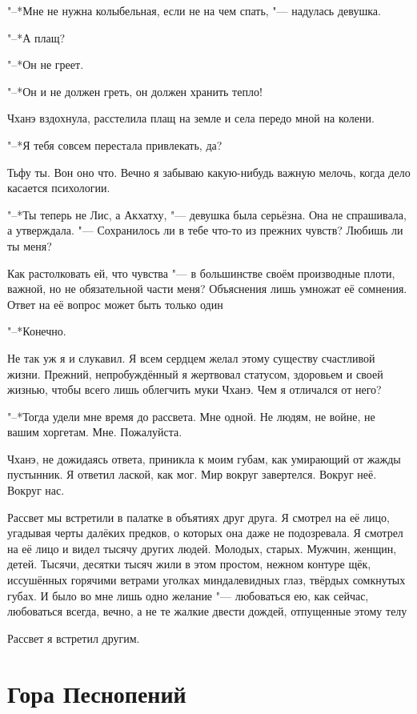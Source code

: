 "--*Мне не нужна колыбельная, если не на чем спать, "--- надулась девушка.

"--*А плащ?

"--*Он не греет.

"--*Он и не должен греть, он должен хранить тепло!

Чханэ вздохнула, расстелила плащ на земле и села передо мной на колени.

"--*Я тебя совсем перестала привлекать, да?

Тьфу ты.
Вон оно что.
Вечно я забываю какую-нибудь важную мелочь, когда дело касается психологии.

"--*Ты теперь не Лис, а Акхатху, "--- девушка была серьёзна.
Она не спрашивала, а утверждала.
"--- Сохранилось ли в тебе что-то из прежних чувств?
Любишь ли ты меня?

Как растолковать ей, что чувства "--- в большинстве своём производные плоти, важной, но не обязательной части меня?
Объяснения лишь умножат её сомнения.
Ответ на её вопрос может быть только один\ldotst

"--*Конечно.

Не так уж я и слукавил.
Я всем сердцем желал этому существу счастливой жизни.
Прежний, непробуждённый я жертвовал статусом, здоровьем и своей жизнью, чтобы всего лишь облегчить муки Чханэ.
Чем я отличался от него?

"--*Тогда удели мне время до рассвета.
Мне одной.
Не людям, не войне, не вашим хоргетам.
Мне.
Пожалуйста.

Чханэ, не дожидаясь ответа, приникла к моим губам, как умирающий от жажды пустынник.
Я ответил лаской, как мог.
Мир вокруг завертелся.
Вокруг неё.
Вокруг нас.

Рассвет мы встретили в палатке в объятиях друг друга.
Я смотрел на её лицо, угадывая черты далёких предков, о которых она даже не подозревала.
Я смотрел на её лицо и видел тысячу других людей.
Молодых, старых.
Мужчин, женщин, детей.
Тысячи, десятки тысяч жили в этом простом, нежном контуре щёк, иссушённых горячими ветрами уголках миндалевидных глаз, твёрдых сомкнутых губах.
И было во мне лишь одно желание "--- любоваться ею, как сейчас, любоваться всегда, вечно, а не те жалкие двести дождей, отпущенные этому телу\ldotst

Рассвет я встретил другим.

\section{Гора Песнопений}

